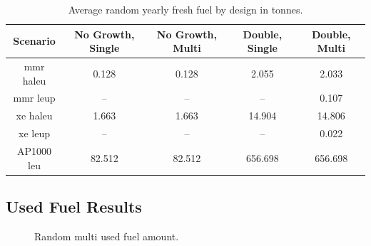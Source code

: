 \begin{table}[H]
    \centering
    \caption{Average random yearly fresh fuel by design in tonnes.}
    \label{tab:random_fresh_avg}
    \begin{tabular}{c c c c c}
       \hline
       Scenario & No Growth, Single & No Growth, Multi & Double, Single & Double, Multi  \\
       \hline
       \gls{mmr} \gls{haleu}   & 0.128    & 0.128   & 2.055    & 2.033    \\
       \gls{mmr} \gls{leup}    & --       & --      & --       & 0.107    \\
       \gls{xe} \gls{haleu}    & 1.663    & 1.663   & 14.904   & 14.806   \\
       \gls{xe} \gls{leup}     & --       & --      & --       & 0.022    \\
       AP1000 \gls{leu}        & 82.512   & 82.512  & 656.698  & 656.698  \\
       \hline
    \end{tabular}
\end{table}





\subsection{Used Fuel Results}
\label{sec:random_used}

\begin{figure}[H]
    \hfill
    \caption{Random multi used fuel amount.}
    \label{fig:random_mf_used}
  \end{figure}


